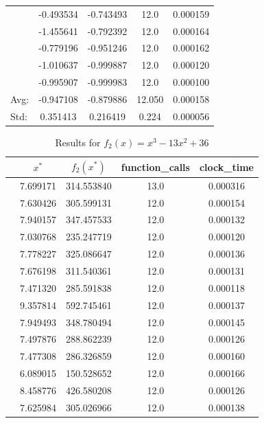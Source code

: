 \documentclass[11pt,onside]{article}
\begin{document}
\begin{description}
\begin {table}[ht]
\begin{tabular}{lcccc}
  & -0.493534 & -0.743493 &            12.0 &    0.000159 \\
  & -1.455641 & -0.792392 &            12.0 &    0.000164 \\
  & -0.779196 & -0.951246 &            12.0 &    0.000162 \\
  & -1.010637 & -0.999887 &            12.0 &    0.000120 \\
  & -0.995907 & -0.999983 &            12.0 &    0.000100 \\
\bottomrule
Avg: & -0.947108 & -0.879886 & 12.050 & 0.000158 \\
Std: & 0.351413 & 0.216419 & 0.224 & 0.000056 \\
\bottomrule
\end{tabular}
\end{table}


\begin {table}[ht]
\centering
\caption {Results for $f_{2}(x) = x^3 - 13x^2 + 36$}
\begin{tabular}{lcccc}
\toprule
{} &      $x^*$ &    $f_{2}(x^*)$ &  function\_calls &  clock\_time \\
\midrule
  &  7.699171 &  314.553840 &            13.0 &    0.000316 \\
  &  7.630426 &  305.599131 &            12.0 &    0.000154 \\
  &  7.940157 &  347.457533 &            12.0 &    0.000132 \\
  &  7.030768 &  235.247719 &            12.0 &    0.000120 \\
  &  7.778227 &  325.086647 &            12.0 &    0.000136 \\
  &  7.676198 &  311.540361 &            12.0 &    0.000131 \\
  &  7.471320 &  285.591838 &            12.0 &    0.000118 \\
  &  9.357814 &  592.745461 &            12.0 &    0.000137 \\
  &  7.949493 &  348.780494 &            12.0 &    0.000145 \\
  &  7.497876 &  288.862239 &            12.0 &    0.000126 \\
  &  7.477308 &  286.326859 &            12.0 &    0.000160 \\
  &  6.089015 &  150.528652 &            12.0 &    0.000166 \\
  &  8.458776 &  426.580208 &            12.0 &    0.000126 \\
  &  7.625984 &  305.026966 &            12.0 &    0.000138 \\

\end{tabular}
\end{table}
\end{description}
\end{document}
